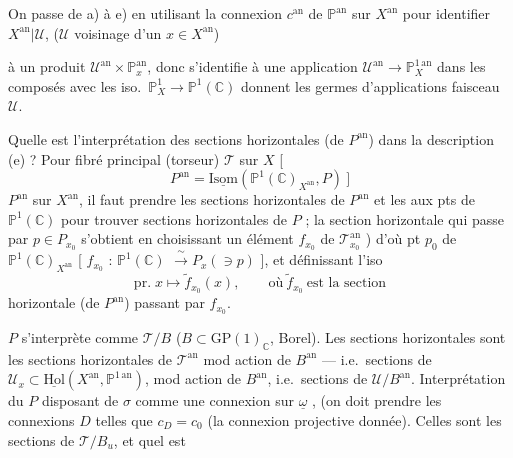 \documentclass[11pt,a4paper]{article}
\begin{document}
On passe de a) à e) en utilisant la connexion $c^{\mathrm{an}}$ de $\mathbb{P}^{\mathrm{an}}$ sur $X^{\mathrm{an}}$ pour identifier \struck{\ill{}} $X^{\mathrm{an}}|\mathcal{U}$, ($\mathcal{U}$  voisinage d'un $x\in X^{\mathrm{an}}$)

à un produit $\mathcal{U}^{\mathrm{an}}\times\mathbb{P}^{\mathrm{an}}_x$, donc \struck{\ill{}} s'identifie à une application $\mathcal{U}^{\mathrm{an}}\to\mathbb{P}^{1\,\mathrm{an}}_X$ dans les composés avec les iso.\ $\mathbb{P}^1_X\to\mathbb{P}^1(\mathbb{C})$ donnent les germes d'applications \struck{\ill{}}   faisceau $\mathcal{U}$.

Quelle est l'interprétation des sections horizontales  (de $P^{\mathrm{an}}$) dans la description (e) ? Pour  fibré principal (torseur) $\mathcal{T}$ sur $X$ [
\[
P^{\mathrm{an}}=\underline{\mathrm{Isom}}(\mathbb{P}^1(\mathbb{C})_{X^{\mathrm{an}}},P)\ ]
\]
$P^{\mathrm{an}}$ sur $X^{\mathrm{an}}$, il faut prendre les sections horizontales de $P^{\mathrm{an}}$ et les  aux pts de $\mathbb{P}^1(\mathbb{C})$ pour trouver sections horizontales de $P$ ; la section horizontale qui passe par \struck{\ill{}} $p\in P_{x_0}$ s'obtient en choisissant un \struck{\ill{}} élément $f_{x_0}$ de $\mathcal{T}^{\mathrm{an}}_{x_0}$ ) d'où \struck{\ill{}} pt $p_0$ de $\mathbb{P}^1(\mathbb{C})_{X^{\mathrm{an}}}$ [ $f_{x_0}$ : $\mathbb{P}^1(\mathbb{C})$ \struck{\ill{}} $\xrightarrow{\ \sim\ }P_x(\ni p)$ ], et définissant l'iso
\[
\text{pr.}\;x\mapsto\widetilde{f}_{x_0}(x),\qquad\text{où}\ \widetilde{f}_{x_0}\ \text{est la section}
\]
horizontale (de $P^{\mathrm{an}}$) passant par $f_{x_0}$. 

$P$ s'interprète comme $\mathcal{T}/B$ ($B\subset\mathrm{GP}(1)_{\mathbb{C}}$, Borel). Les sections horizontales  sont les sections horizontales de $\mathcal{T}^{\mathrm{an}}$ mod action de $B^{\mathrm{an}}$ — i.e.\ sections de $\mathcal{U}_x\subset\underline{\mathrm{Hol}}(X^{\mathrm{an}},\mathbb{P}^{1\,\mathrm{an}})$, mod action de $B^{\mathrm{an}}$, i.e.\ sections de $\mathcal{U}/B^{\mathrm{an}}$. Interprétation du $P$ disposant de $\sigma$ comme  une connexion  sur $\underline{\omega}$ , (on doit prendre les connexions $D$ telles que $c_D=c_0$ (la connexion projective donnée). Celles  sont les sections de $\mathcal{T}/B_u$, et quel est
\end{document}

